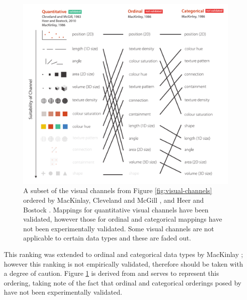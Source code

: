 \begin{figure}[h!]
\centering
\includegraphics[width=\textwidth]{images/related-work/visual-channel-ordering.pdf}
\caption{A subset of the visual channels from Figure \ref{fig:visual-channels} ordered by MacKinlay\cite{mackinlay1986automating}, Cleveland and McGill \cite{cleveland1984graphical}, and Heer and Bostock \cite{heer2010crowdsourcing}.
Mappings for quantitative visual channels have been validated, however those for ordinal and categorical mappings have not been experimentally validated.
Some visual channels are not applicable to certain data types and these are faded out.}
\label{fig:channel-ordering}
\end{figure}

This ranking was extended to ordinal and categorical data types by MacKinlay \cite{mackinlay1986automating}; however this ranking is not empirically validated, therefore should be taken with a degree of caution. 
Figure \ref{fig:channel-ordering} is derived from \cite{mackinlay1986automating} and serves to represent this ordering, taking note of the fact that ordinal and categorical orderings posed by \cite{mackinlay1986automating} have not been experimentally validated. 

